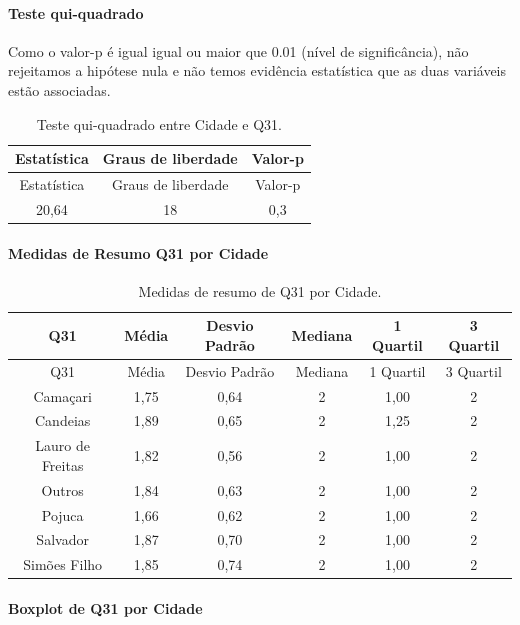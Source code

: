 \documentclass[]{article}
\let\oldparagraph\paragraph
\renewcommand{\paragraph}[1]{\oldparagraph{#1}\mbox{}}
\begin{document}
\hypertarget{teste-qui-quadrado-87}{%
\paragraph{Teste qui-quadrado}\label{teste-qui-quadrado-87}}

Como o valor-p é igual igual ou maior que 0.01 (nível de significância), não rejeitamos a hipótese nula e não temos evidência estatística que as duas variáveis estão associadas.

\begin{longtable}[]{@{}ccc@{}}
\caption{\label{tab:unnamed-chunk-1019}Teste qui-quadrado entre Cidade e Q31.}\tabularnewline
\toprule
Estatística & Graus de liberdade & Valor-p\tabularnewline
\midrule
\endfirsthead
\toprule
Estatística & Graus de liberdade & Valor-p\tabularnewline
\midrule
\endhead
20,64 & 18 & 0,3\tabularnewline
\bottomrule
\end{longtable}

\cleardoublepage

\hypertarget{medidas-de-resumo-q31-por-cidade}{%
\paragraph{Medidas de Resumo Q31 por Cidade}\label{medidas-de-resumo-q31-por-cidade}}

\begin{longtable}[]{@{}cccccc@{}}
\caption{\label{tab:unnamed-chunk-1020}Medidas de resumo de Q31 por Cidade.}\tabularnewline
\toprule
Q31 & Média & Desvio Padrão & Mediana & 1 Quartil & 3 Quartil\tabularnewline
\midrule
\endfirsthead
\toprule
Q31 & Média & Desvio Padrão & Mediana & 1 Quartil & 3 Quartil\tabularnewline
\midrule
\endhead
Camaçari & 1,75 & 0,64 & 2 & 1,00 & 2\tabularnewline
Candeias & 1,89 & 0,65 & 2 & 1,25 & 2\tabularnewline
Lauro de Freitas & 1,82 & 0,56 & 2 & 1,00 & 2\tabularnewline
Outros & 1,84 & 0,63 & 2 & 1,00 & 2\tabularnewline
Pojuca & 1,66 & 0,62 & 2 & 1,00 & 2\tabularnewline
Salvador & 1,87 & 0,70 & 2 & 1,00 & 2\tabularnewline
Simões Filho & 1,85 & 0,74 & 2 & 1,00 & 2\tabularnewline
\bottomrule
\end{longtable}

\hypertarget{boxplot-de-q31-por-cidade}{%
\paragraph{Boxplot de Q31 por Cidade}\label{boxplot-de-q31-por-cidade}}
\end{document}
